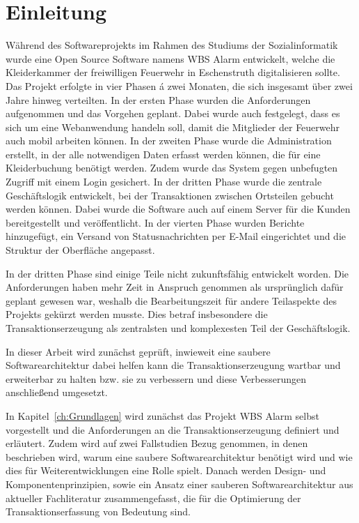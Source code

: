 \chapter{Einleitung}
\label{ch:Einleitung}

Während des Softwareprojekts im Rahmen des Studiums der Sozialinformatik wurde eine Open Source Software namens WBS Alarm entwickelt, welche die Kleiderkammer der freiwilligen Feuerwehr in Eschenstruth digitalisieren sollte. Das Projekt erfolgte in vier Phasen á zwei Monaten, die sich insgesamt über zwei Jahre hinweg verteilten. In der ersten Phase wurden die Anforderungen aufgenommen und das Vorgehen geplant. Dabei wurde auch festgelegt, dass es sich um eine Webanwendung handeln soll, damit die Mitglieder der Feuerwehr auch mobil arbeiten können. In der zweiten Phase wurde die Administration erstellt, in der alle notwendigen Daten erfasst werden können, die für eine Kleiderbuchung benötigt werden. Zudem wurde das System gegen unbefugten Zugriff mit einem Login gesichert. In der dritten Phase wurde die zentrale Geschäftslogik entwickelt, bei der Transaktionen zwischen Ortsteilen gebucht werden können. Dabei wurde die Software auch auf einem Server für die Kunden bereitgestellt und veröffentlicht. In der vierten Phase wurden Berichte hinzugefügt, ein Versand von Statusnachrichten per E-Mail eingerichtet und die Struktur der Oberfläche angepasst.

In der dritten Phase sind einige Teile nicht zukunftsfähig entwickelt worden. Die Anforderungen haben mehr Zeit in Anspruch genommen als ursprünglich dafür geplant gewesen war, weshalb die Bearbeitungszeit für andere Teilaspekte des Projekts gekürzt werden musste. Dies betraf insbesondere die Transaktionserzeugung als zentralsten und komplexesten Teil der Geschäftslogik. 

In dieser Arbeit wird zunächst geprüft, inwieweit eine saubere Softwarearchitektur dabei helfen kann die Transaktionserzeugung wartbar und erweiterbar zu halten bzw. sie zu verbessern und diese Verbesserungen anschließend umgesetzt. 

In Kapitel~\ref{ch:Grundlagen} wird zunächst das Projekt WBS Alarm selbst vorgestellt und die Anforderungen an die Transaktionserzeugung definiert und erläutert. Zudem wird auf zwei Fallstudien Bezug genommen, in denen beschrieben wird, warum eine saubere Softwarearchitektur benötigt wird und wie dies für Weiterentwicklungen eine Rolle spielt. Danach werden Design- und Komponentenprinzipien, sowie ein Ansatz einer sauberen Softwarearchitektur aus aktueller Fachliteratur zusammengefasst, die für die Optimierung der Transaktionserfassung von Bedeutung sind.

